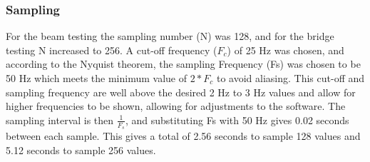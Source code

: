 \subsubsection{Sampling}
For the beam testing the sampling number (N) was 128, and for the bridge testing N increased to 256. A cut-off frequency ($F_c$) of 25 Hz was chosen, and according to the Nyquist theorem, the sampling Frequency (Fs) was chosen to be 50 Hz which meets the minimum value of $2 * F_c$ to avoid aliasing. This cut-off and sampling frequency are well above the desired 2 Hz to 3 Hz values and allow for higher frequencies to be shown, allowing for adjustments to the software. The sampling interval is then $\frac{1}{F_s}$, and substituting Fs with 50 Hz gives 0.02 seconds between each sample. This gives a total of 2.56 seconds to sample 128 values and 5.12 seconds to sample 256 values. 

